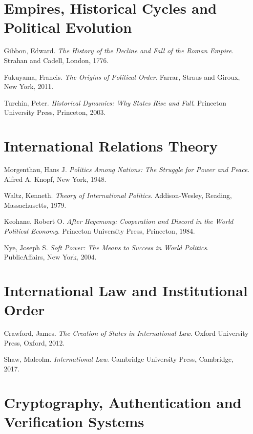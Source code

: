 \documentclass[11pt,openany]{book}
\theoremstyle{plain}
\theoremstyle{definition}
\begin{document}
\section*{Empires, Historical Cycles and Political Evolution}

Gibbon, Edward.
\textit{The History of the Decline and Fall of the Roman Empire}.
Strahan and Cadell, London, 1776.

Fukuyama, Francis.
\textit{The Origins of Political Order}.
Farrar, Straus and Giroux, New York, 2011.

Turchin, Peter.
\textit{Historical Dynamics: Why States Rise and Fall}.
Princeton University Press, Princeton, 2003.


\section*{International Relations Theory}

Morgenthau, Hans J.
\textit{Politics Among Nations: The Struggle for Power and Peace}.
Alfred A. Knopf, New York, 1948.

Waltz, Kenneth.
\textit{Theory of International Politics}.
Addison-Wesley, Reading, Massachusetts, 1979.

Keohane, Robert O.
\textit{After Hegemony: Cooperation and Discord in the World Political Economy}.
Princeton University Press, Princeton, 1984.

Nye, Joseph S.
\textit{Soft Power: The Means to Success in World Politics}.
PublicAffairs, New York, 2004.


\section*{International Law and Institutional Order}

Crawford, James.
\textit{The Creation of States in International Law}.
Oxford University Press, Oxford, 2012.

Shaw, Malcolm.
\textit{International Law}.
Cambridge University Press, Cambridge, 2017.


\section*{Cryptography, Authentication and Verification Systems}
\end{document}
